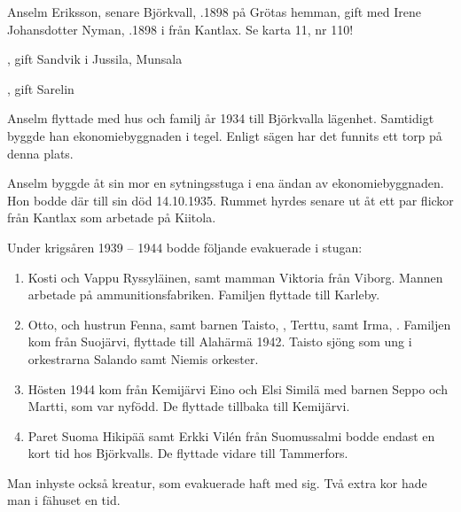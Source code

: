 Anselm Eriksson, senare Björkvall, .1898 på Grötas hemman, gift med Irene Johansdotter Nyman, .1898 i från Kantlax. Se karta 11, nr 110!
\begin{jhchildren}
  \item {}
  \item {}, gift Sandvik i Jussila, Munsala
  \item {}, gift Sarelin
  \item {}
\end{jhchildren}
Anselm flyttade med hus och familj år 1934 till Björkvalla lägenhet. Samtidigt byggde han ekonomiebyggnaden i tegel. Enligt sägen har det funnits ett torp på denna plats.




Anselm byggde åt sin mor en sytningsstuga i ena ändan av ekonomiebyggnaden. Hon bodde där till sin död 14.10.1935.
Rummet hyrdes senare ut  åt ett par flickor från Kantlax som 	arbetade på Kiitola.

Under krigsåren 1939 – 1944 bodde följande evakuerade i stugan:
\begin{enumerate}
  \item Kosti och Vappu Ryssyläinen, samt mamman Viktoria från Viborg. Mannen arbetade på ammunitionsfabriken. Familjen
	flyttade till Karleby.
  \item Otto,  och hustrun Fenna,  samt barnen Taisto, , Terttu,  samt Irma, . Familjen kom från Suojärvi, flyttade till Alahärmä 1942. Taisto sjöng som ung i orkestrarna Salando samt Niemis orkester.
  \item Hösten 1944 kom från Kemijärvi Eino och Elsi Similä med barnen Seppo och Martti, som var nyfödd. De flyttade tillbaka till Kemijärvi.
  \item Paret Suoma Hikipää samt Erkki Vilén från Suomussalmi bodde endast en kort tid hos Björkvalls. De flyttade vidare till Tammerfors.
\end{enumerate}

Man inhyste också kreatur, som evakuerade haft med sig. Två extra kor hade man i fähuset en tid.



